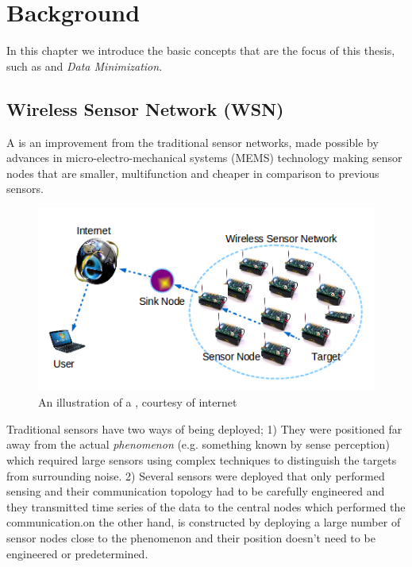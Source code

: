\chapter{Background}

In this chapter we introduce the basic concepts that are the focus of this thesis, such as \wsns and \textit{Data Minimization}. %


\section{Wireless Sensor Network (WSN)}



A \wsn is an improvement from the traditional sensor networks, made possible by advances in micro-electro-mechanical systems (MEMS) technology making sensor nodes that are smaller, multifunction and cheaper in comparison to previous sensors. 

\begin{figure}[ht]
    \includegraphics{include/figures/WSN_illu}
    \caption{An illustration of a \wsn, courtesy of internet}
    \label{fig:wsn_illustration}
\end{figure}

Traditional sensors have two ways of being deployed; 1) They were positioned far away from the actual \textit{phenomenon} (e.g. something known by sense perception) which required large sensors using complex techniques to distinguish the targets from surrounding noise. 2) Several sensors were deployed that only performed sensing and their communication topology had to be carefully engineered and they transmitted time series of the data to the central nodes which performed the communication.\wsns on the other hand, is constructed by deploying a large number of sensor nodes close to the phenomenon and their position doesn't need to be engineered or predetermined.\cite{wsnsurvey} 


